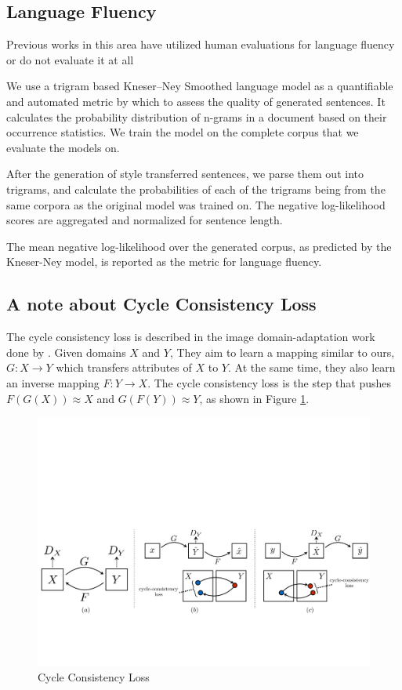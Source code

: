 \subsection{Language Fluency}

Previous works in this area have utilized human evaluations \citep{hu2017toward,shen2017style} for language fluency or do not evaluate it at all \cite{fu2017style}

We use a trigram based Kneser–Ney Smoothed language model \citep{kneser1995improved} as a quantifiable and automated metric by which to assess the quality of generated sentences. It calculates the probability distribution of n-grams in a document based on their occurrence statistics. We train the model on the complete corpus that we evaluate the models on.

After the generation of style transferred sentences, we parse them out into trigrams, and calculate the probabilities of each of the trigrams being from the same corpora as the original model was trained on. The negative log-likelihood scores are aggregated and normalized for sentence length.

The mean negative log-likelihood over the generated corpus, as predicted by the Kneser-Ney model, is reported as the metric for language fluency.


\subsection{A note about Cycle Consistency Loss}

The cycle consistency loss is described in the image domain-adaptation work done by \cite{zhu2017unpaired}. Given domains $X$ and $Y$, They aim to learn a mapping similar to ours, $G: X \rightarrow Y$ which transfers attributes of $X$ to $Y$. At the same time, they also learn an inverse mapping $F: Y \rightarrow X$. The cycle consistency loss is the step that pushes $F(G(X)) \approx X$ and $G(F(Y)) \approx Y$, as shown in Figure \ref{fig:cycle-consistency}.

\begin{figure}[ht]
	\centering
	\includegraphics[width=\textwidth]{images/cycle-consistency}
	\caption{\label{fig:cycle-consistency} Cycle Consistency Loss}
\end{figure}

